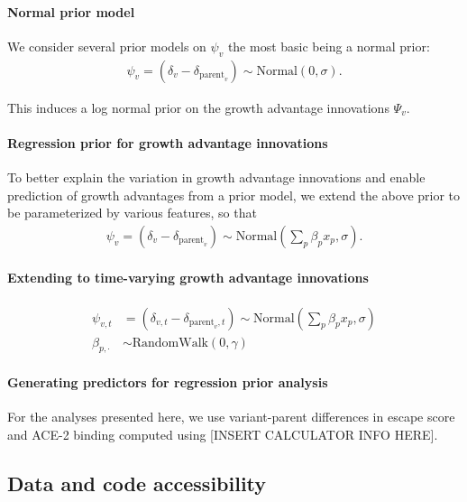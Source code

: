 \documentclass[12pt,oneside,letterpaper]{article}
\begin{document}
\paragraph{Normal prior model}%

We consider several prior models on $\psi_{v}$ the most basic being a normal prior:
\begin{align*}
    \psi_{v} = (\delta_{v} - \delta_{\text{parent}_{v}}) \sim \text{Normal}(0, \sigma).
\end{align*}

This induces a log normal prior on the growth advantage innovations $\Psi_{v}$.

\paragraph{Regression prior for growth advantage innovations}%

To better explain the variation in growth advantage innovations and enable prediction of growth advantages from a prior model, we extend the above prior to be parameterized by various features, so that
\begin{align*}
    \psi_{v} = (\delta_{v} - \delta_{\text{parent}_{v}}) \sim \text{Normal} \left( \sum_{p} \beta_{p} x_{p}, \sigma \right).
\end{align*}

\paragraph{Extending to time-varying growth advantage innovations}%

\begin{align*}
    \psi_{v,t} &= (\delta_{v,t} - \delta_{\text{parent}_{v}, t}) \sim \text{Normal} \left( \sum_{p} \beta_{p} x_{p}, \sigma \right) \\
    \beta_{p, \cdot} &\sim \text{RandomWalk}(0, \gamma)
\end{align*}


\paragraph{Generating predictors for regression prior analysis}%

For the analyses presented here, we use variant-parent differences in escape score and ACE-2 binding computed using [INSERT CALCULATOR INFO HERE].

\subsection*{Data and code accessibility}
\end{document}
